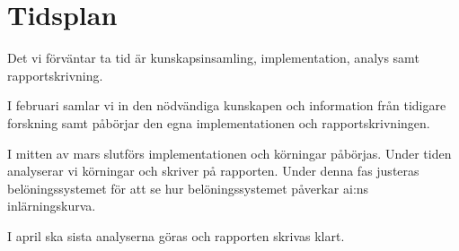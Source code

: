 \documentclass[a4paper,11pt]{article}
\begin{document}
\newpage
\section*{Tidsplan}

Det vi förväntar ta tid är kunskapsinsamling, implementation, analys samt rapportskrivning.

I februari samlar vi in den nödvändiga kunskapen och information från tidigare forskning samt påbörjar den egna implementationen och rapportskrivningen.

I mitten av mars slutförs implementationen och körningar påbörjas. Under tiden analyserar vi körningar och skriver på rapporten. Under denna fas justeras belöningssystemet för att se hur belöningssystemet påverkar ai:ns inlärningskurva.

I april ska sista analyserna göras och rapporten skrivas klart.
\end{document}

